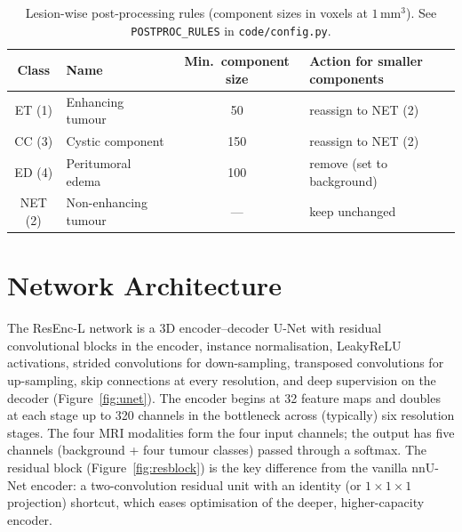 \documentclass[11pt,a4paper]{article}
\begin{document}
\begin{table}[h]
\centering
\caption{Lesion-wise post-processing rules (component sizes in voxels at
$1\,\text{mm}^3$). See \texttt{POSTPROC\_RULES} in \texttt{code/config.py}.}
\label{tab:pp}
\begin{tabular}{clcl}
\toprule
Class & Name & Min.\ component size & Action for smaller components \\
\midrule
ET (1) & Enhancing tumour & 50  & reassign to NET (2) \\
CC (3) & Cystic component & 150 & reassign to NET (2) \\
ED (4) & Peritumoral edema & 100 & remove (set to background) \\
NET (2) & Non-enhancing tumour & --- & keep unchanged \\
\bottomrule
\end{tabular}
\end{table}

\section{Network Architecture}
\label{sec:arch}
The ResEnc-L network is a 3D encoder--decoder U-Net with residual convolutional
blocks in the encoder, instance normalisation, LeakyReLU activations, strided
convolutions for down-sampling, transposed convolutions for up-sampling, skip
connections at every resolution, and deep supervision on the decoder
(Figure~\ref{fig:unet}). The encoder begins at 32 feature maps and doubles at each
stage up to 320 channels in the bottleneck across (typically) six resolution stages.
The four MRI modalities form the four input channels; the output has five channels
(background + four tumour classes) passed through a softmax. The residual block
(Figure~\ref{fig:resblock}) is the key difference from the vanilla nnU-Net encoder:
a two-convolution residual unit with an identity (or $1\!\times\!1\!\times\!1$
projection) shortcut, which eases optimisation of the deeper, higher-capacity
encoder.
\end{document}

